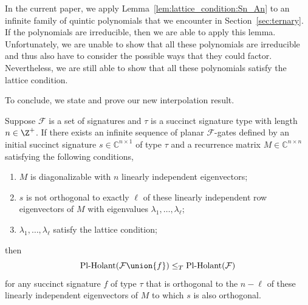 \documentclass[11pt]{article}
\newcommand{\PlHolant}{\operatorname{Pl-Holant}}
\begin{document}
In the current paper,
we apply Lemma~\ref{lem:lattice_condition:Sn_An} to an infinite family of quintic polynomials that we encounter in Section~\ref{sec:ternary}.
If the polynomials are irreducible,
then we are able to apply this lemma.
Unfortunately,
we are unable to show that all these polynomials are irreducible and thus also have to consider the possible ways that they could factor.
Nevertheless, we are still able to show that all these polynomials satisfy the lattice condition.

To conclude,
we state and prove our new interpolation result.

\begin{lemma} \label{lem:interpolate_all_not_orthogonal}
 Suppose $\mathcal{F}$ is a set of signatures and $\tau$ is a succinct signature type with length $n \in \Z^+$.
 If there exists an infinite sequence of planar $\mathcal{F}$-gates defined by an initial succinct signature $s \in \mathbb{C}^{n \times 1}$ of type $\tau$
 and a recurrence matrix $M \in \mathbb{C}^{n \times n}$ satisfying the following conditions,
 \begin{enumerate}
  \item $M$ is diagonalizable with $n$ linearly independent eigenvectors;
  \item $s$ is not orthogonal to exactly $\ell$ of these linearly independent row eigenvectors of $M$ with eigenvalues $\lambda_1, \dotsc, \lambda_\ell$;
  \item $\lambda_1, \dotsc, \lambda_\ell$ satisfy the lattice condition;
 \end{enumerate}
 then
 \[
  \PlHolant(\mathcal{F} \union \{f\}) \le_T \PlHolant(\mathcal{F})
 \]
 for any succinct signature $f$ of type $\tau$ that is orthogonal to the $n - \ell$ of these linearly independent eigenvectors of $M$ to which $s$ is also orthogonal.
\end{lemma}
\end{document}
